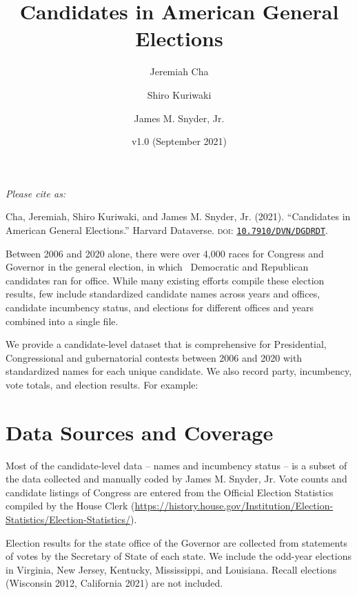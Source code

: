 \documentclass[12pt]{article}
\title{\Large\textbf{Candidates in American General Elections}}
\author[1]{\normalsize Jeremiah Cha}
\author[2]{\normalsize Shiro Kuriwaki}
\author[1]{\normalsize James M. Snyder, Jr.}
\affil[1]{\footnotesize Department of Government, Harvard University.}
\affil[2]{\footnotesize Department of Political Science, Stanford University}
\date{\vspace{-0.2in} \normalsize v1.0 (September 2021)}
\begin{document}
\maketitle 

\vspace{-0.2in}

\begin{center}
\begin{minipage}{0.85\linewidth}
\emph{Please cite as: }

Cha, Jeremiah, Shiro Kuriwaki, and James M. Snyder, Jr. (2021). ``Candidates in American General Elections.'' Harvard Dataverse. \textsc{doi}: \href{https://doi.org/10.7910/DVN/DGDRDT}{\texttt{10.7910/DVN/DGDRDT}}.
\end{minipage}
\end{center}
\smallskip

Between 2006 and 2020 alone, there were over 4,000 races for Congress and Governor in the general election, in which \unskip \ Democratic and Republican candidates ran for office.  
While many existing efforts compile these election results, few include standardized candidate names across years and offices, candidate incumbency status, and elections for different offices and years combined into a single file.

We provide a candidate-level dataset that is comprehensive for Presidential, Congressional and gubernatorial contests between 2006 and 2020 with standardized names for each unique candidate. We also record party, incumbency, vote totals, and election results. For example:

\begin{table}[!h]
\centering
\footnotesize

\end{table}

\newpage

\section{Data Sources and Coverage}

Most of the candidate-level data -- names and incumbency status -- is a subset of the data collected and manually coded by James M. Snyder, Jr. Vote counts and candidate listings of Congress are entered from the Official Election Statistics compiled by the House Clerk (\url{https://history.house.gov/Institution/Election-Statistics/Election-Statistics/}).  

Election results for the state office of the Governor are collected from statements of votes by the Secretary of State of each state. We include the odd-year elections in Virginia, New Jersey, Kentucky, Mississippi, and Louisiana. 
Recall elections (Wisconsin 2012, California 2021) are not included.
\end{document}
